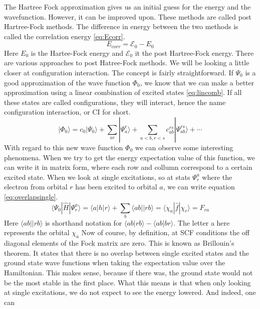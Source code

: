 \documentclass[twoside,twocolumn,9pt]{article}
\begin{document}
The Hartree Fock approximation gives us an initial guess for the energy and the wavefunction. However, it can be improved upon. These methods are called post Hartree-Fock methods.
The difference in energy between the two methods is called the correlation energy \eqref{eq:Ecorr}.
\begin{equation}\label{eq:Ecorr}
  E_{corr} = \mathcal{E}_0 - E_0
\end{equation}
Here $E_0$ is the Hartee-Fock energy and $\mathcal{E}_0$ it the post Hartree-Fock energy. There are various approaches to post Hatree-Fock methods. We will be looking a little closer
at configuration interaction. The concept is fairly straightforward. If $\Psi_0$ is a good approximation of the wave function $\Phi_0$, we know that we can make a better approximation
using a linear combination of excited states \eqref{eq:lincomb}\cite{Szabo1996}. If all these states are called configurations, they will interact, hence the name configuration
interaction, or CI for short.
\begin{equation}\label{eq:lincomb}
  |\Phi_0\rangle = c_0|\Psi_0\rangle + \sum_{ar}|\Psi_a^r\rangle + \sum_{a<b,r<s}c_{ab}^{rs}|\Psi^{rs}_{ab} \rangle + \cdots
\end{equation}
With regard to this new wave function $\Phi_0$ we can observe some interesting phenomena. When we try to get the energy expectation value of this function, we can write it in matrix
form, where each row and collumn correspond to a certain excited state. When we look at single excitations, so at stats $\Psi_r^a$ where the electron from orbital $r$ has been
excited to orbital $a$, we can write equation \eqref{eq:overlapsingle}\cite{Szabo1996}.
\begin{equation}\label{eq:overlapsingle}
  \langle\Psi_0 |\hat{H}|\Psi_r^a\rangle = \langle a|h|r \rangle + \sum_b \langle ab||rb \rangle = \langle \chi_a |\hat{f}| \chi_r \rangle = F_{ra}
\end{equation}
Here $\langle ab||rb \rangle$ is shorthand notation for $\langle ab | rb \rangle - \langle ab | br \rangle$. The letter a here represents the orbital $\chi_a$
Now of course, by definition, at SCF conditions the off diagonal elements of the Fock matrix are zero. This is known as Brillouin's theorem. It states that there is no overlap
between single excited states and the ground state wave functions when taking the expectation value over the Hamiltonian. This makes sense, because if there was, the ground state
would not be the most stable in the first place. What this means is that when only looking at single excitations, we do not expect to see the energy lowered. And indeed, one can
\end{document}
